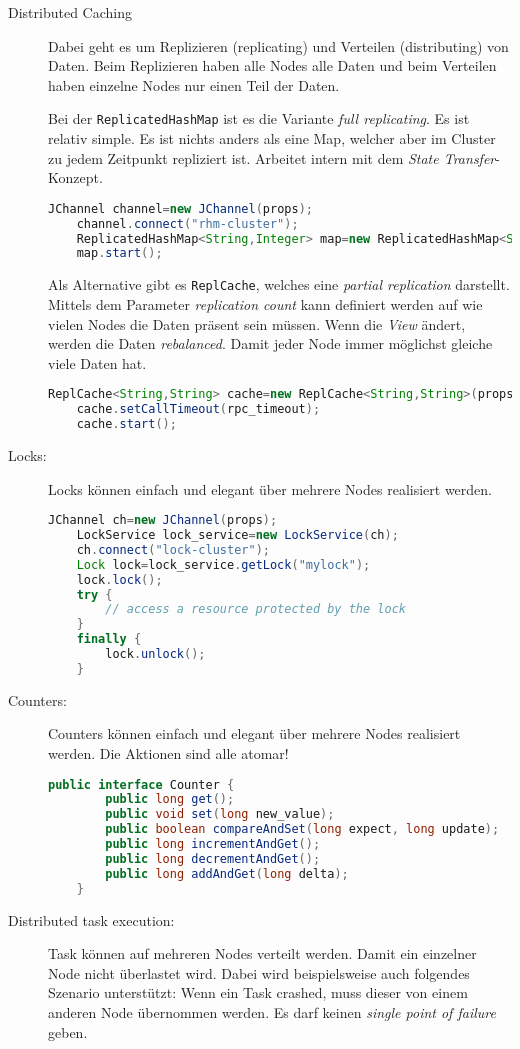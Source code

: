\begin{description}
	\item[Distributed Caching] Dabei geht es um Replizieren (replicating) und Verteilen (distributing) von Daten. Beim Replizieren haben alle Nodes alle Daten und beim Verteilen haben  einzelne Nodes nur einen Teil der Daten.
	
	Bei der \verb|ReplicatedHashMap| ist es die Variante \emph{full replicating}. Es ist relativ simple. Es ist nichts anders als eine Map, welcher aber im Cluster zu jedem Zeitpunkt repliziert ist. Arbeitet intern mit dem \emph{State Transfer}-Konzept.
	
	\begin{lstlisting}[language=Java]
	JChannel channel=new JChannel(props);
	channel.connect("rhm-cluster");
	ReplicatedHashMap<String,Integer> map=new ReplicatedHashMap<String,Integer>(channel);
	map.start();
	\end{lstlisting}
	
	Als Alternative gibt es \verb|ReplCache|, welches eine \emph{partial replication} darstellt. Mittels dem Parameter \emph{replication count} kann definiert werden auf wie vielen Nodes die Daten präsent sein müssen. Wenn die \emph{View} ändert, werden die Daten \emph{rebalanced}. Damit jeder Node immer möglichst gleiche viele Daten hat.
	
	\begin{lstlisting}[language=Java]
	ReplCache<String,String> cache=new ReplCache<String,String>(props, cluster_name);
	cache.setCallTimeout(rpc_timeout);
	cache.start();
	\end{lstlisting}
	
	\item[Locks:] Locks können einfach und elegant über mehrere Nodes realisiert werden.
	
	\begin{lstlisting}[language=Java]
	JChannel ch=new JChannel(props);
	LockService lock_service=new LockService(ch);
	ch.connect("lock-cluster");
	Lock lock=lock_service.getLock("mylock");
	lock.lock();
	try {
		// access a resource protected by the lock
	}
	finally {
		lock.unlock();
	}
	\end{lstlisting}
	\item[Counters:] Counters können einfach und elegant über mehrere Nodes realisiert werden. Die Aktionen sind alle atomar!
	
	\begin{lstlisting}[language=Java]
	public interface Counter {
		public long get();
		public void set(long new_value);
		public boolean compareAndSet(long expect, long update);
		public long incrementAndGet();
		public long decrementAndGet();
		public long addAndGet(long delta);
	}
	\end{lstlisting}
	
	\item[Distributed task execution:] Task können auf mehreren Nodes verteilt werden. Damit ein einzelner Node nicht überlastet wird. Dabei wird beispielsweise auch folgendes Szenario unterstützt: Wenn ein Task crashed, muss dieser von einem anderen Node übernommen werden. Es darf keinen \emph{single point of failure} geben.

\end{description}


